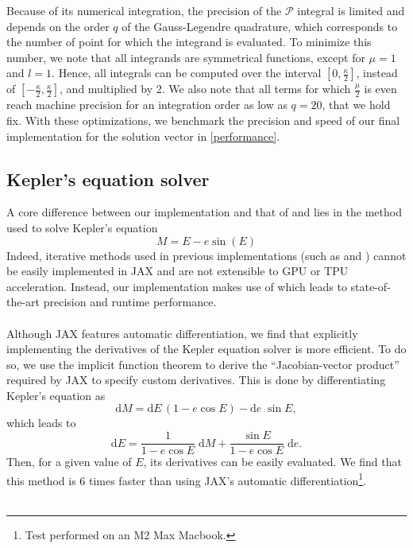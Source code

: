 \documentclass[modern]{aastex631}
\begin{document}
Because of its numerical integration, the precision of the $\mathcal{P}$ integral is limited and depends on the order $q$ of the Gauss-Legendre quadrature, which corresponds to the number of point for which the integrand is evaluated. To minimize this number, we note that all integrands are symmetrical functions, except for $\mu=1$ and $l=1$. Hence, all integrals can be computed over the interval $\left[0, \frac{\kappa}{2}\right]$, instead of $\left[-\frac{\kappa}{2}, \frac{\kappa}{2}\right]$, and multiplied by 2. We also note that all terms for which $\frac{\mu}{2}$ is even reach machine precision for an integration order as low as $q=20$, that we hold fix. With these optimizations, we benchmark the precision and speed of our final implementation for the solution vector in \autoref{performance}.

\subsection{Kepler's equation solver}
A core difference between our implementation and that of \cite{starry} and \cite{exoplanet} lies in the method used to solve Kepler's equation
\begin{equation}
    M = E - e \sin(E)
\end{equation}
Indeed, iterative methods used in previous implementations (such as \citealt{Raposo2017} and \citealt{Brandt2021}) cannot be easily implemented in \textsf{JAX} and are not extensible to GPU or TPU acceleration. Instead, our implementation makes use of \cite{Markley1995} which leads to state-of-the-art precision and runtime performance.\\\\
Although JAX features automatic differentiation, we find that explicitly implementing the derivatives of the Kepler equation solver is more efficient. To do so, we use the implicit function theorem to derive the “Jacobian-vector product” required by \textsf{JAX} to specify custom derivatives. This is done by differentiating Kepler's equation as
\begin{equation}
    \mathrm{d}M = \mathrm{d}E\,(1 - e \cos E) - \mathrm{d}e\;\sin E,
\end{equation}
which leads to
\begin{equation}
\mathrm{d}E = \frac{1}{1 - e \cos E}\;\mathrm{d}M + \frac{\sin E}{1 - e \cos E}\;\mathrm{d}e.
\end{equation}
Then, for a given value of $E$, its derivatives can be easily evaluated. We find that this method is 6 times faster than using \textsf{JAX}'s automatic differentiation\footnote{Test performed on an M2 Max Macbook.}.\\\\
\end{document}
